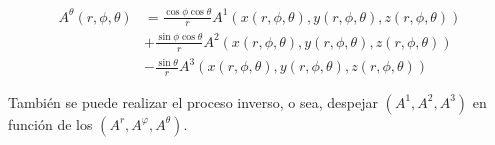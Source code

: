 \documentclass[../apunte_mecanica_clasica.tex]{subfiles}%
\begin{document}
\begin{itemize}
\begin{equation*}
\begin{aligned}
A^\theta(r, \phi, \theta) &= \frac{\cos\phi \cos\theta}{r} A^1(x(r, \phi, \theta), y(r, \phi, \theta), z(r, \phi, \theta)) \\ &
+ \frac{\sin\phi \cos\theta}{r} A^2(x(r, \phi, \theta), y(r, \phi, \theta), z(r, \phi, \theta)) \\&- \frac{\sin\theta}{r} A^3(x(r, \phi, \theta), y(r, \phi, \theta), z(r, \phi, \theta))
\end{aligned}
\end{equation*}

\end{itemize}

También se puede realizar el proceso inverso, o sea, despejar 
$(A^1, A^2, A^3)$ en función de los $(A^r, A^\varphi, A^\theta)$. 
\end{document}
